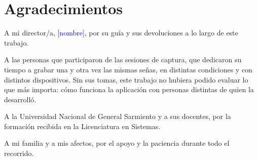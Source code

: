 \documentclass[12pt,a4paper,oneside]{report}
\begin{document}
\chapter*{Agradecimientos}

A mi director/a, \textcolor{blue}{[nombre]}, por su guía y sus devoluciones a lo largo de este trabajo.

A las personas que participaron de las sesiones de captura, que dedicaron su tiempo a grabar una y otra vez las mismas señas, en distintas condiciones y con distintos dispositivos. Sin sus tomas, este trabajo no hubiera podido evaluar lo que más importa: cómo funciona la aplicación con personas distintas de quien la desarrolló.

A la Universidad Nacional de General Sarmiento y a sus docentes, por la formación recibida en la Licenciatura en Sistemas.

A mi familia y a mis afectos, por el apoyo y la paciencia durante todo el recorrido.




\clearpage
{}
{}
\listoffigures

\clearpage
{}
{}
\listoftables

\tableofcontents
\clearpage













\clearpage
{}



\appendix

\end{document}
